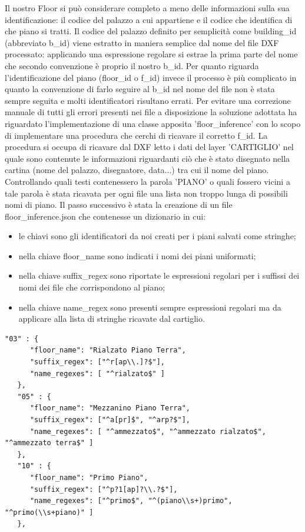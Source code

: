 \documentclass[12pt]{report}
\begin{document}
Il nostro Floor si può considerare completo a meno delle informazioni sulla sua identificazione: il codice del palazzo a cui appartiene e il codice che identifica di che piano si tratti. 
Il codice del palazzo definito per semplicità come building\_id (abbreviato b\_id) viene estratto in maniera semplice dal nome del file DXF processato: applicando una espressione regolare si estrae la prima parte del nome che secondo convenzione è proprio il nostro b\_id. 
Per quanto riguarda l'identificazione del piano (floor\_id o f\_id) invece il processo è più complicato in quanto la convenzione di farlo seguire al b\_id nel nome del file non è stata sempre seguita e molti identificatori risultano errati. 
Per evitare una correzione manuale di tutti gli errori presenti nei file a disposizione la soluzione adottata ha riguardato l'implementazione di una classe apposita 'floor\_inference' con lo scopo di implementare una procedura che cerchi di ricavare il corretto f\_id.
La procedura si occupa di ricavare dal DXF letto i dati del layer 'CARTIGLIO' nel quale sono contenute le informazioni riguardanti ciò che è stato disegnato nella cartina (nome del palazzo, disegnatore, data...) tra cui il nome del piano.
Controllando quali testi contenessero la parola 'PIANO' o quali fossero vicini a tale parola è stata ricavata per ogni file una lista non troppo lunga di possibili nomi di piano.  
Il passo successivo è stata la creazione di un file floor\_inference.json che contenesse un dizionario in cui:
\begin{itemize}
\item le chiavi sono gli identificatori da noi creati per i piani salvati come stringhe;
\item nella chiave floor\_name sono indicati i nomi dei piani uniformati;
\item nella chiave suffix\_regex sono riportate le espressioni regolari per i suffissi dei nomi dei file che corrispondono al piano;
\item nella chiave name\_regex sono presenti sempre espressioni regolari ma da applicare alla lista di stringhe ricavate dal cartiglio.
\end{itemize}

\begin{lstlisting}[label=codice,caption=Esempio del dizionario in "'floor\_inference.json'", frame=single]
"03" : {
      "floor_name": "Rialzato Piano Terra",
      "suffix_regex": ["^r[ap\\.]?$"],
      "name_regexes": [ "^rialzato$" ]
   },
   "05" : {
      "floor_name": "Mezzanino Piano Terra",
      "suffix_regex": ["^a[pr]$", "^arp?$"],
      "name_regexes": [ "^ammezzato$", "^ammezzato rialzato$", "^ammezzato terra$" ]
   },
   "10" : {
      "floor_name": "Primo Piano",
      "suffix_regex": ["^p?1[ap]?\\.?$"],
      "name_regexes": ["^primo$", "^(piano\\s+)primo", "^primo(\\s+piano)" ]
   },
\end{lstlisting}
\end{document}
